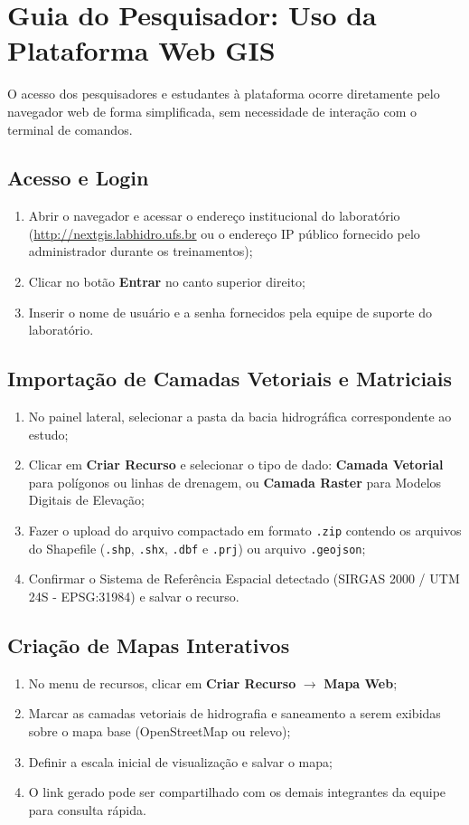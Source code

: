 \section{Guia do Pesquisador: Uso da Plataforma Web GIS}

O acesso dos pesquisadores e estudantes à plataforma ocorre diretamente pelo navegador web de forma simplificada, sem necessidade de interação com o terminal de comandos.

\subsection{Acesso e Login}
\begin{enumerate}
    \item Abrir o navegador e acessar o endereço institucional do laboratório (\url{http://nextgis.labhidro.ufs.br} ou o endereço IP público fornecido pelo administrador durante os treinamentos);
    \item Clicar no botão \textbf{Entrar} no canto superior direito;
    \item Inserir o nome de usuário e a senha fornecidos pela equipe de suporte do laboratório.
\end{enumerate}

\subsection{Importação de Camadas Vetoriais e Matriciais}
\begin{enumerate}
    \item No painel lateral, selecionar a pasta da bacia hidrográfica correspondente ao estudo;
    \item Clicar em \textbf{Criar Recurso} e selecionar o tipo de dado: \textbf{Camada Vetorial} para polígonos ou linhas de drenagem, ou \textbf{Camada Raster} para Modelos Digitais de Elevação;
    \item Fazer o upload do arquivo compactado em formato \texttt{.zip} contendo os arquivos do Shapefile (\texttt{.shp}, \texttt{.shx}, \texttt{.dbf} e \texttt{.prj}) ou arquivo \texttt{.geojson};
    \item Confirmar o Sistema de Referência Espacial detectado (SIRGAS 2000 / UTM 24S - EPSG:31984) e salvar o recurso.
\end{enumerate}

\subsection{Criação de Mapas Interativos}
\begin{enumerate}
    \item No menu de recursos, clicar em \textbf{Criar Recurso} $\rightarrow$ \textbf{Mapa Web};
    \item Marcar as camadas vetoriais de hidrografia e saneamento a serem exibidas sobre o mapa base (OpenStreetMap ou relevo);
    \item Definir a escala inicial de visualização e salvar o mapa;
    \item O link gerado pode ser compartilhado com os demais integrantes da equipe para consulta rápida.
\end{enumerate}

